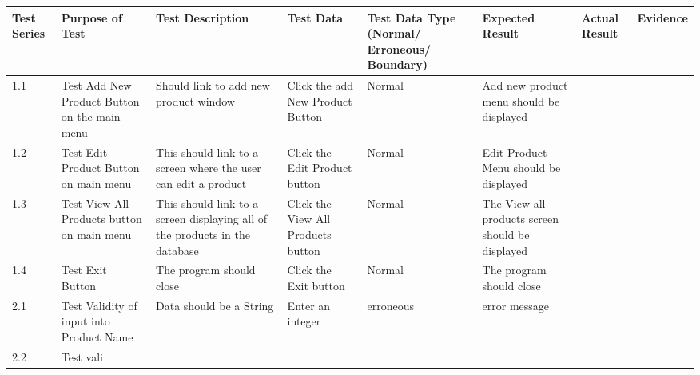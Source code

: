 \begin{landscape}
\begin{center}
    \begin{longtable}{|p{1.5cm}|p{2.5cm}|p{2.5cm}|p{2cm}|p{2cm}|p{2cm}|p{2cm}|p{2cm}|}
        \hline
        \textbf{Test Series} & \textbf{Purpose of Test} & \textbf{Test Description} & \textbf{Test Data} & \textbf{Test Data Type (Normal/ Erroneous/ Boundary)} & \textbf{Expected Result} & \textbf{Actual Result} & \textbf{Evidence}\\ \hline
        1.1 & Test Add New Product Button on the main menu & Should link to add new product window & Click the add New Product Button & Normal & Add new product menu should be displayed &  & \\ \hline 
        1.2 & Test Edit Product Button on main menu & This should link to a screen where the user can edit a product & Click the Edit Product button & Normal & Edit Product Menu should be displayed & &  \\ \hline
        1.3 & Test View All Products button on main menu & This should link to a screen displaying all of the products in the database & Click the View All Products button & Normal & The View all products screen should be displayed &  &  \\ \hline
        1.4 & Test Exit Button & The program should close & Click the Exit button & Normal & The program should close & &  \\ \hline
        2.1 & Test Validity of input into Product Name & Data should be a String & Enter an integer & erroneous & error message & & \\ \hline
        2.2 & Test vali
       
    \end{longtable}
\end{center}
\end{landscape}
